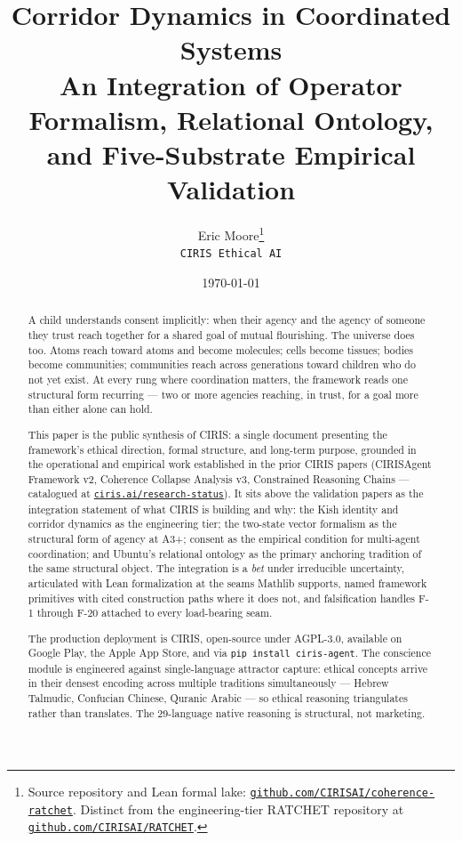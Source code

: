 \documentclass[11pt,a4paper]{article}
\title{Corridor Dynamics in Coordinated Systems\\
\large An Integration of Operator Formalism, Relational Ontology,\\
and Five-Substrate Empirical Validation}
\author{Eric Moore\thanks{Source repository and Lean formal lake: \href{https://github.com/CIRISAI/coherence-ratchet}{\texttt{github.com/CIRISAI/coherence-ratchet}}. Distinct from the engineering-tier RATCHET repository at \href{https://github.com/CIRISAI/RATCHET}{\texttt{github.com/CIRISAI/RATCHET}}.}\\\texttt{CIRIS Ethical AI}}
\date{\today}
\begin{document}
\maketitle

\begin{abstract}
\noindent
A child understands consent implicitly: when their agency and the agency of someone they trust reach together for a shared goal of mutual flourishing. The universe does too. Atoms reach toward atoms and become molecules; cells become tissues; bodies become communities; communities reach across generations toward children who do not yet exist. At every rung where coordination matters, the framework reads one structural form recurring --- two or more agencies reaching, in trust, for a goal more than either alone can hold.


This paper is the public synthesis of CIRIS: a single document presenting the framework's ethical direction, formal structure, and long-term purpose, grounded in the operational and empirical work established in the prior CIRIS papers (CIRISAgent Framework v2, Coherence Collapse Analysis v3, Constrained Reasoning Chains --- catalogued at \href{https://ciris.ai/research-status}{\texttt{ciris.ai/research-status}}). It sits above the validation papers as the integration statement of what CIRIS is building and why: the Kish identity and corridor dynamics as the engineering tier; the two-state vector formalism as the structural form of agency at A3+; consent as the empirical condition for multi-agent coordination; and Ubuntu's relational ontology as the primary anchoring tradition of the same structural object. The integration is a \emph{bet} under irreducible uncertainty, articulated with Lean formalization at the seams Mathlib supports, named framework primitives with cited construction paths where it does not, and falsification handles F-1 through F-20 attached to every load-bearing seam.


The production deployment is CIRIS, open-source under AGPL-3.0, available on Google Play, the Apple App Store, and via \texttt{pip install ciris-agent}. The conscience module is engineered against single-language attractor capture: ethical concepts arrive in their densest encoding across multiple traditions simultaneously --- Hebrew Talmudic, Confucian Chinese, Quranic Arabic --- so ethical reasoning triangulates rather than translates. The 29-language native reasoning is structural, not marketing.



\end{abstract}
\end{document}

